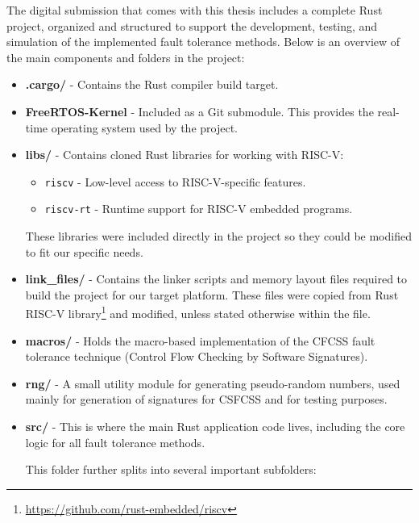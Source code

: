 \documentclass[12pt, letterpaper]{article}
\begin{document}
\begin{appendices}
The digital submission that comes with this thesis includes a complete Rust project, organized and structured to support the development, testing, and simulation of the implemented fault tolerance methods. Below is an overview of the main components and folders in the project:

\begin{itemize}
    \item \textbf{.cargo/} - Contains the Rust compiler build target.
    
    \item \textbf{FreeRTOS-Kernel} - Included as a Git submodule. This provides the real-time operating system used by the project.
    
    \item \textbf{libs/} - Contains cloned Rust libraries for working with RISC-V:
    \begin{itemize}
        \item \texttt{riscv} - Low-level access to RISC-V-specific features.
        \item \texttt{riscv-rt} - Runtime support for RISC-V embedded programs.
    \end{itemize}
    These libraries were included directly in the project so they could be modified to fit our specific needs.
    
    \item \textbf{link\_files/} - Contains the linker scripts and memory layout files required to build the project for our target platform. These files were copied from Rust RISC-V library\footnote{\url{https://github.com/rust-embedded/riscv}} and modified, unless stated otherwise within the file.
    
    \item \textbf{macros/} - Holds the macro-based implementation of the CFCSS fault tolerance technique (Control Flow Checking by Software Signatures).
    
    \item \textbf{rng/} - A small utility module for generating pseudo-random numbers, used mainly for generation of signatures for CSFCSS and for testing purposes.
    
    \item \textbf{src/} - This is where the main Rust application code lives, including the core logic for all fault tolerance methods.
    
    This folder further splits into several important subfolders:
    

\end{itemize}
\end{appendices}
\end{document}
